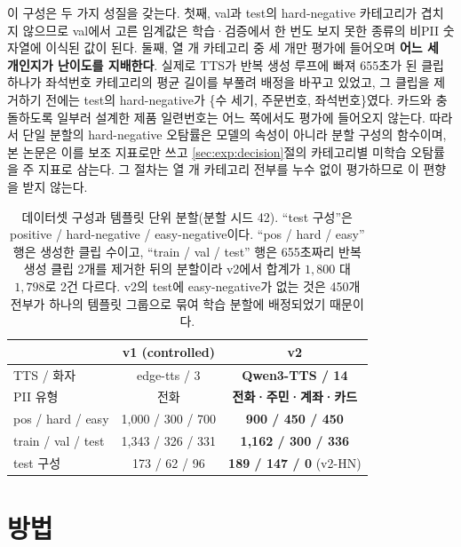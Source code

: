 \documentclass[10pt,twocolumn]{article}
\renewcommand{\emph}[1]{\textbf{#1}}
\begin{document}
이 구성은 두 가지 성질을 갖는다. 첫째, val과 test의 hard-negative 카테고리가 겹치지 않으므로
val에서 고른 임계값은 학습·검증에서 한 번도 보지 못한 종류의 비PII 숫자열에 이식된 값이 된다.
둘째, 열 개 카테고리 중 세 개만 평가에 들어오며 \emph{어느 세 개인지가 난이도를 지배한다}.
실제로 TTS가 반복 생성 루프에 빠져 655초가 된 클립 하나가 좌석번호 카테고리의 평균 길이를
부풀려 배정을 바꾸고 있었고, 그 클립을 제거하기 전에는 test의 hard-negative가 \{수 세기,
주문번호, 좌석번호\}였다. 카드와 충돌하도록 일부러 설계한 제품 일련번호는 어느 쪽에서도 평가에
들어오지 않는다. 따라서 단일 분할의 hard-negative 오탐률은 모델의 속성이 아니라 분할 구성의
함수이며, 본 논문은 이를 보조 지표로만 쓰고 \ref{sec:exp:decision}절의 카테고리별 미학습
오탐률을 주 지표로 삼는다. 그 절차는 열 개 카테고리 전부를 누수 없이 평가하므로 이 편향을 받지
않는다.

\begin{table}[!t]
\centering
\caption{데이터셋 구성과 템플릿 단위 분할(분할 시드 42). ``test 구성''은 positive /
hard-negative / easy-negative이다. ``pos / hard / easy'' 행은 생성한 클립 수이고, ``train / val / test'' 행은 655초짜리 반복 생성
클립 2개를 제거한 뒤의 분할이라 v2에서 합계가 $1{,}800$ 대 $1{,}798$로 2건 다르다. v2의 test에
easy-negative가 없는 것은 450개 전부가 하나의 템플릿 그룹으로 묶여 학습 분할에 배정되었기
때문이다.}
\label{tab:data}
\footnotesize
\setlength{\tabcolsep}{2pt}
\begin{tabular}{lcc}
\toprule
 & v1 (controlled) & \textbf{v2} \\
\midrule
TTS / 화자 & edge-tts / 3 & \textbf{Qwen3-TTS / 14} \\
PII 유형 & 전화 & \textbf{전화·주민·계좌·카드} \\
pos / hard / easy & 1{,}000 / 300 / 700 & \textbf{900 / 450 / 450} \\
train / val / test & 1{,}343 / 326 / 331 & \textbf{1{,}162 / 300 / 336} \\
test 구성 & 173 / 62 / 96 & \textbf{189 / 147 / 0} (v2-HN) \\
\bottomrule
\end{tabular}
\end{table}

\section{방법}\label{sec:method}
\end{document}
